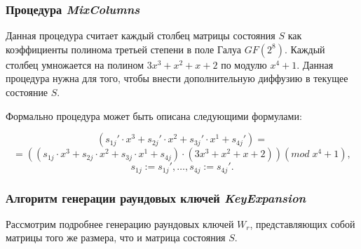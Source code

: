 \subsubsection{Процедура \textit{MixColumns}} \label{MixColumns}

    Данная процедура считает каждый столбец матрицы состояния $S$ как коэффициенты полинома третьей степени в поле Галуа
    $GF(2^8)$. Каждый столбец умножается на полином $3x^3 + x^2 + x + 2$ по модулю $x^4 + 1$. Данная процедура нужна для того,
    чтобы внести дополнительную диффузию в текущее состояние $S$.

    Формально процедура может быть описана следующими формулами:

    \begin{equation}
        (s_{1j}' \cdot x^3 + s_{2j}' \cdot x^2 + s_{3j}' \cdot x^1 + s_{4j}') =
    \end{equation}
    \begin{equation}
        = \left( (s_{1j} \cdot x^3 + s_{2j} \cdot x^2 + s_{3j} \cdot x^1 + s_{4j}) \cdot (3x^3 + x^2 + x + 2) \right) (mod \; x^4 + 1),
    \end{equation}
    \begin{equation}
        s_{1j} := s_{1j}', \dots, s_{4j} := s_{4j}'.
    \end{equation}

\subsubsection{Алгоритм генерации раундовых ключей \textit{KeyExpansion}} \label{KeyExpansion}

    Рассмотрим подробнее генерацию раундовых ключей $W_r$, представляющих собой матрицы того же размера,
    что и матрица состояния $S$.

